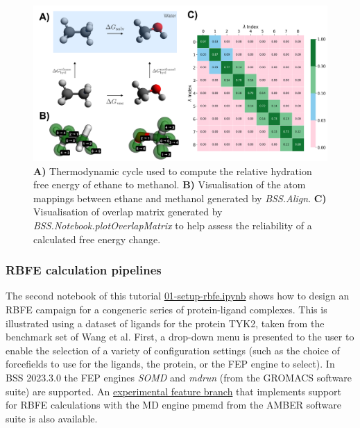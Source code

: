 \begin{figure}[htp]
\includegraphics[width=\linewidth]{LIVECOMS/04_fep/introfep_updated.png}
\caption{ \textbf{A)} Thermodynamic cycle used to compute the relative hydration free energy of ethane to methanol. \textbf{B)} Visualisation of the atom mappings between ethane and methanol generated by \emph{BSS.Align}. \textbf{C)} Visualisation of overlap matrix generated by \emph{BSS.Notebook.plotOverlapMatrix} to help assess the reliability of a calculated free energy change.}
\label{thermodynamic_cycle_fig}
\end{figure}


\subsubsection{RBFE calculation pipelines}

The second notebook of this tutorial \href{https://github.com/OpenBioSim/biosimspace_tutorials/blob/main/04_fep/02_RBFE/01_setup_rbfe.ipynb}{01-setup-rbfe.ipynb} shows how to design an RBFE campaign for a congeneric series of protein-ligand complexes. This is illustrated using a dataset of ligands for the protein TYK2, taken from the benchmark set of Wang et al.\cite{Wang2015} 
First, a drop-down menu is presented to the user to enable the selection of a variety of configuration settings (such as the choice of forcefields to use for the ligands, the protein, or the FEP engine to select). In BSS 2023.3.0 the FEP engines \emph{SOMD} and \emph{mdrun} (from the GROMACS software suite) are supported. An \href{https://github.com/michellab/BioSimSpace/tree/feature-amber-fep}{experimental feature branch} that implements support for RBFE calculations with the MD engine pmemd from the AMBER software suite is also available. 

